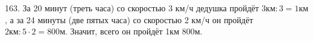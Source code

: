 163. За 20 минут (треть часа) со скоростью 3 км/ч дедушка пройдёт $3\text{км}:3=1\text{км}$, а за 24 минуты (две пятых часа) со скоростью 2 км/ч он пройдёт $2\text{км}:5\cdot2=800$м. Значит, всего он пройдёт 1км 800м.\\
